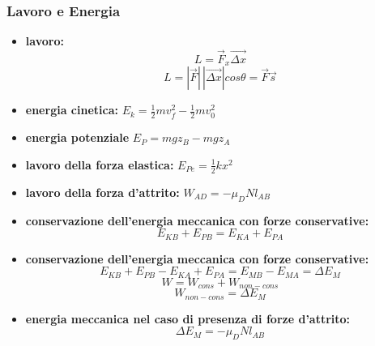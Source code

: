 \documentclass[a4paper,12pt, oneside]{book}
\begin{document}
\subsubsection{Lavoro e Energia}
\begin{itemize}
\item \textbf{lavoro:}
$$L=\vec{F}_x\vec{\Delta x}$$
$$L=|\vec{F}|\,|\vec{\Delta x}|cos\theta=\vec{F}\vec{s}$$
\item \textbf{energia cinetica:}
$E_k=\frac{1}{2}mv_f^2-\frac{1}{2}mv_0^2$
\item \textbf{energia potenziale}
$E_P=mgz_B-mgz_A$
\item \textbf{lavoro della forza elastica:}
$E_{Pe}=\frac{1}{2}kx^2$
\item \textbf{lavoro della forza d'attrito:}
$W_{AD}=-\mu_DNl_{AB}$
\item \textbf{conservazione dell'energia meccanica con forze conservative:}
$$E_{KB}+E_{PB}=E_{KA}+E_{PA}$$
\item \textbf{conservazione dell'energia meccanica con forze conservative:}
$$E_{KB}+E_{PB}-E_{KA}+E_{PA}=E_{MB}-E_{MA}=\Delta E_M$$
$$W=W_{cons}+W_{non-cons}$$
$$W_{non-cons}=\Delta E_M$$
\item \textbf{energia meccanica nel caso di presenza di forze d'attrito:}
$$\Delta E_M=-\mu_DNl_{AB}$$
\end{itemize}
\end{document}
